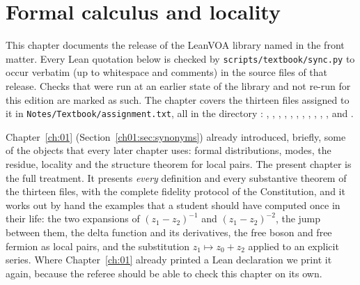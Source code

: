 \chapter{Formal calculus and locality}\label{ch:L01}
\begingroup\setlength{\emergencystretch}{3em}

\providecommand{\loneW}{\mathcal{W}}
\providecommand{\loneV}{V}
\providecommand{\loneiota}[2]{\iota_{#1,#2}}
\providecommand{\lonedelta}{\delta(z_1,z_2)}
\providecommand{\lonecoef}[1]{\big[#1\big]}
\providecommand{\lonebinom}[2]{\binom{#1}{#2}}
\providecommand{\lonewarn}[1]{the trap box on p.~\pageref{#1}}

This chapter documents the release of the LeanVOA library named in the front matter. Every Lean quotation below is checked by \texttt{scripts/\allowbreak textbook/\allowbreak sync.py}
to occur verbatim (up to whitespace and comments) in the source files of that release. Checks that were run at an earlier state of the library and not re-run
for this edition are marked as such. The chapter covers the thirteen files assigned to it in
\texttt{Notes/\allowbreak Textbook/\allowbreak assignment.txt}, all in the directory
: , ,
, , ,
, , ,
, , ,
 and .

Chapter~\ref{ch:01} (Section~\ref{ch01:sec:synonyms}) already introduced, briefly, some of the objects
that every later chapter uses: formal distributions, modes, the residue, locality and the
structure theorem for local pairs. The present chapter is the full treatment. It presents
\emph{every} definition and every substantive theorem of the thirteen files, with the complete
fidelity protocol of the Constitution, and it works out by hand the examples that a student
should have computed once in their life: the two expansions of $(z_1-z_2)^{-1}$ and
$(z_1-z_2)^{-2}$, the jump between them, the delta function and its derivatives, the free boson
and free fermion as local pairs, and the substitution $z_1\mapsto z_0+z_2$ applied to an
explicit series. Where Chapter~\ref{ch:01} already printed a Lean declaration we print it
again, because the referee should be able to check this chapter on its own.

